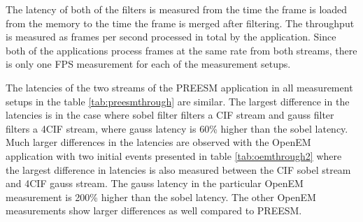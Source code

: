 The latency of both of the filters is measured from the time the frame is loaded
from the memory to the time the frame is merged after filtering. The throughput
is measured as frames per second processed in total by the application. Since
both of the applications process frames at the same rate from both streams,
there is only one FPS measurement for each of the measurement setups.

The latencies of the two streams of the PREESM application in all measurement
setups in the table \ref{tab:preesmthrough} are similar. The largest difference
in the latencies is in the case where sobel filter filters a CIF stream and
gauss filter filters a 4CIF stream, where gauss latency is 60\% higher than the
sobel latency. Much larger differences in the latencies are observed with the
OpenEM application with two initial events presented in table
\ref{tab:oemthrough2} where the largest difference in latencies is also measured
between the CIF sobel stream and 4CIF gauss stream. The gauss latency in the
particular OpenEM measurement is 200\% higher than the sobel latency. The other
OpenEM measurements show larger differences as well compared to PREESM.

